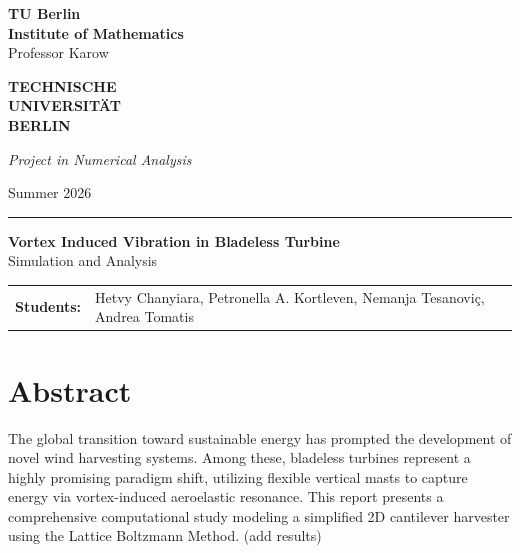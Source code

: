 \documentclass[11pt,a4paper]{article}
\newcommand{\course}{Project in Numerical Analysis}
\newcommand{\semester}{Summer 2026}
\newcommand{\professor}{Professor Karow}
\newcommand{\studentname}{Hetvy Chanyiara, Petronella A. Kortleven, Nemanja Tesanovi\c{c}, Andrea Tomatis}
\begin{document}
\noindent
\begin{minipage}[t]{0.62\textwidth}
{\bfseries TU Berlin}\\
{\bfseries Institute of Mathematics}\\
\professor
\end{minipage}%
\begin{minipage}[t]{0.38\textwidth}
\raggedleft
{\color{accent}\bfseries TECHNISCHE}\\[-0.15em]
{\color{accent}\bfseries UNIVERSIT\"AT}\\[-0.15em]
{\color{accent}\bfseries BERLIN}
\end{minipage}

\vspace{1.2em}
\noindent
\begin{minipage}[t]{0.62\textwidth}
\textit{\course}
\end{minipage}%
\begin{minipage}[t]{0.38\textwidth}
\raggedleft \semester
\end{minipage}

\vspace{0.35em}
\hrule

\vspace{1.2em}
\begin{center}
    {\LARGE \bfseries Vortex Induced Vibration in Bladeless Turbine}\\[0.4em]
    {\normalsize Simulation and Analysis}
\end{center}


\vspace{0.6em}
\noindent
\begin{tabular}{@{}p{}p{}@{}}
\textbf{Students:} & \studentname \\
\end{tabular}

\vspace{2em}

\section{Abstract}

The global transition toward sustainable energy has prompted the development of novel wind harvesting systems. Among these, bladeless turbines represent a highly promising paradigm shift, utilizing flexible vertical masts to capture energy via vortex-induced aeroelastic resonance. This report presents a comprehensive computational study modeling a simplified 2D cantilever harvester using the Lattice Boltzmann Method. (add results)
\end{document}
